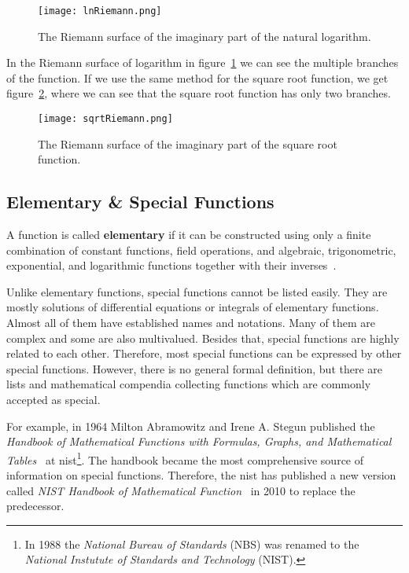 \begin{figure}[!ht]
	\centering
	\texttt{[image: lnRiemann.png]}
	\caption{The Riemann surface of the imaginary part of the natural logarithm.}
	\label{fig:lnRiemann}
\end{figure}

In the Riemann surface of logarithm in figure~\ref{fig:lnRiemann} we can see the multiple branches of the function. If we use the same method for the square root function, we get figure~\ref{fig:sqrtRiemann}, where we can see that the square root function has only two branches.

\begin{figure}[!ht]
	\centering
	\texttt{[image: sqrtRiemann.png]}
	\caption{The Riemann surface of the imaginary part of the square root function.}
	\label{fig:sqrtRiemann}
\end{figure}

\subsection{Elementary \& Special Functions}\label{subsec:special-functions}
A function is called \textbf{elementary} if it can be constructed using only a finite combination of constant functions, field operations, and algebraic, trigonometric, exponential, and logarithmic functions together with their inverses~\parencites{Elementary:1}[145]{Elementary:2}.

Unlike elementary functions, special functions cannot be listed easily. They are mostly solutions of differential equations or integrals of elementary functions. Almost all of them have established names and notations. Many of them are complex and some are also multivalued. Besides that, special functions are highly related to each other. Therefore, most special functions can be expressed by other special functions. However, there is no general formal definition, but there are lists and mathematical compendia collecting functions which are commonly accepted as special. 

For example, in 1964 Milton Abramowitz and Irene A. Stegun published the \textit{Handbook of Mathematical Functions with Formulas, Graphs, and Mathematical Tables}~\parencite{AbramowitzStegun} at \gls{nist}\footnote{In 1988 the \textit{National Bureau of Standards} (NBS) was renamed to the \textit{National Instutute of Standards and Technology} (NIST).}. The handbook became the most comprehensive source of information on special functions. Therefore, the \gls{nist} has published a new version called \textit{NIST Handbook of Mathematical Function}~\parencite{NIST:Handbook} in 2010 to replace the predecessor.

